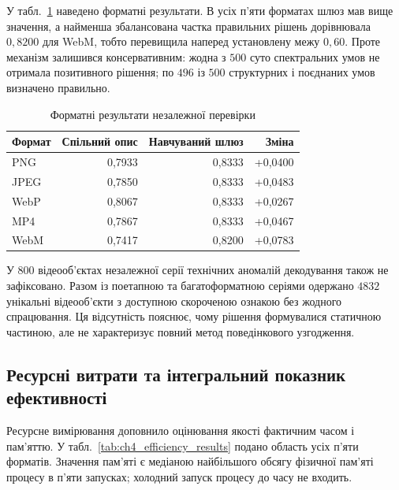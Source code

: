 У табл.~\ref{tab:ch4_method2_formats} наведено форматні результати. В усіх п’яти форматах шлюз мав вище значення, а найменша збалансована частка правильних рішень дорівнювала $0{,}8200$ для WebM, тобто перевищила наперед установлену межу $0{,}60$. Проте механізм залишився консервативним: жодна з $500$ суто спектральних умов не отримала позитивного рішення; по $496$ із $500$ структурних і поєднаних умов визначено правильно.

\begin{table}[htbp]
\caption{Форматні результати незалежної перевірки}
\label{tab:ch4_method2_formats}
\centering
\small
\begin{tabular}{lrrr}
\toprule
Формат & Спільний опис & Навчуваний шлюз & Зміна \\
\midrule
PNG & 0,7933 & 0,8333 & +0,0400 \\
JPEG & 0,7850 & 0,8333 & +0,0483 \\
WebP & 0,8067 & 0,8333 & +0,0267 \\
MP4 & 0,7867 & 0,8333 & +0,0467 \\
WebM & 0,7417 & 0,8200 & +0,0783 \\
\bottomrule
\end{tabular}
\end{table}

У $800$ відеооб’єктах незалежної серії технічних аномалій декодування також не зафіксовано. Разом із поетапною та багатоформатною серіями одержано $4832$ унікальні відеооб’єкти з доступною скороченою ознакою без жодного спрацювання. Ця відсутність пояснює, чому рішення формувалися статичною частиною, але не характеризує повний метод поведінкового узгодження.

\subsection{Ресурсні витрати та інтегральний показник ефективності}

Ресурсне вимірювання доповнило оцінювання якості фактичним часом і пам’яттю. У табл.~\ref{tab:ch4_efficiency_results} подано область усіх п’яти форматів. Значення пам’яті є медіаною найбільшого обсягу фізичної пам’яті процесу в п’яти запусках; холодний запуск процесу до часу не входить.

